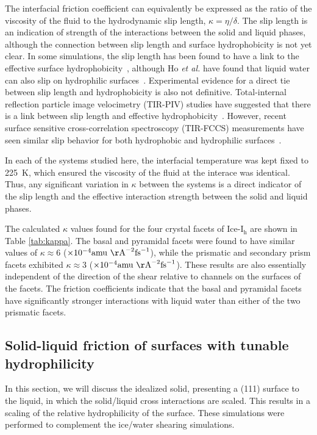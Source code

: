 \documentclass[aps,jcp,preprint,showpacs,superscriptaddress,groupedaddress]{revtex4}  %
\begin{document}
The interfacial friction coefficient can equivalently be expressed as
the ratio of the viscosity of the fluid to the hydrodynamic slip
length, $\kappa = \eta / \delta$. The slip length is an indication of
strength of the interactions between the solid and liquid phases,
although the connection between slip length and surface hydrophobicity
is not yet clear. In some simulations, the slip length has been found
to have a link to the effective surface
hydrophobicity~\cite{Sendner:2009uq}, although Ho \textit{et al.} have
found that liquid water can also slip on hydrophilic
surfaces~\cite{Ho:2011zr}. Experimental evidence for a direct tie
between slip length and hydrophobicity is also not
definitive. Total-internal reflection particle image velocimetry
(TIR-PIV) studies have suggested that there is a link between slip
length and effective
hydrophobicity~\cite{Lasne:2008vn,Bouzigues:2008ys}. However, recent
surface sensitive cross-correlation spectroscopy (TIR-FCCS)
measurements have seen similar slip behavior for both hydrophobic and
hydrophilic surfaces~\cite{Schaeffel:2013kx}.

In each of the systems studied here, the interfacial temperature was
kept fixed to 225~K, which ensured the viscosity of the fluid at the
interace was identical. Thus, any significant variation in $\kappa$
between the systems is a direct indicator of the slip length and the
effective interaction strength between the solid and liquid phases.

The calculated $\kappa$ values found for the four crystal facets of
Ice-I$_\mathrm{h}$ are shown in Table \ref{tab:kappa}. The basal and
pyramidal facets were found to have similar values of $\kappa \approx
6$ ($\times 10^{-4} \mathrm{amu~\AA}^{-2}\mathrm{fs}^{-1}$), while the
prismatic and secondary prism facets exhibited $\kappa \approx 3$
($\times 10^{-4} \mathrm{amu~\AA}^{-2}\mathrm{fs}^{-1}$). These
results are also essentially independent of the direction of the shear
relative to channels on the surfaces of the facets.  The friction
coefficients indicate that the basal and pyramidal facets have
significantly stronger interactions with liquid water than either of
the two prismatic facets.

\subsection{Solid-liquid friction of surfaces with tunable hydrophilicity}
In this section, we will discuss the idealized solid, presenting a (111)
surface to the liquid, in which the solid/liquid cross interactions are 
scaled. This results in a scaling of the relative hydrophilicity of the 
surface. These simulations were performed to complement the ice/water 
shearing simulations. 
\end{document}
